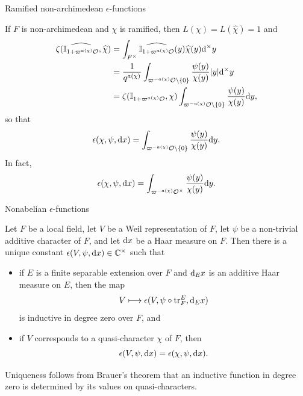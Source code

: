 \begin{frame}{Ramified non-archimedean $ \epsilon $-functions}

If $ F $ is non-archimedean and $ \chi $ is ramified, then $ L(\chi) = L(\widehat{\chi}) = 1 $ and
\begin{align*}
\zeta(\widehat{\mathbb{I}_{1 + \varpi^{a(\chi)}\mathcal{O}}}, \widehat{\chi})
& = \int_{F^\times} \widehat{\mathbb{I}_{1 + \varpi^{a(\chi)}\mathcal{O}}}(y)\widehat{\chi}(y)\mathrm{d}^\times y \\
& = \dfrac{1}{q^{a(\chi)}}\int_{\varpi^{-a(\chi)}\mathcal{O} \setminus \{0\}} \dfrac{\psi(y)}{\chi(y)}|y|\mathrm{d}^\times y \\
& = \zeta(\mathbb{I}_{1 + \varpi^{a(\chi)}\mathcal{O}}, \chi)\int_{\varpi^{-a(\chi)}\mathcal{O} \setminus \{0\}} \dfrac{\psi(y)}{\chi(y)}\mathrm{d} y,
\end{align*}
so that
$$ \epsilon(\chi, \psi, \mathrm{d} x) = \int_{\varpi^{-a(\chi)}\mathcal{O} \setminus \{0\}} \dfrac{\psi(y)}{\chi(y)}\mathrm{d} y. $$
In fact,
$$ \epsilon(\chi, \psi, \mathrm{d} x) = \int_{\varpi^{-a(\chi)}\mathcal{O}^\times} \dfrac{\psi(y)}{\chi(y)}\mathrm{d} y. $$

\end{frame}

\begin{frame}{Nonabelian $ \epsilon $-functions}

\begin{theorem}
Let $ F $ be a local field, let $ V $ be a Weil representation of $ F $, let $ \psi $ be a non-trivial additive character of $ F $, and let $ \mathrm{d} x $ be a Haar measure on $ F $. Then there is a unique constant $ \epsilon(V, \psi, \mathrm{d} x) \in \mathbb{C}^\times $ such that
\begin{itemize}
\item if $ E $ is a finite separable extension over $ F $ and $ \mathrm{d}_Ex $ is an additive Haar measure on $ E $, then the map
$$ V \longmapsto \epsilon(V, \psi \circ \operatorname{tr}_F^E, \mathrm{d}_Ex) $$
is inductive in degree zero over $ F $, and
\item if $ V $ corresponds to a quasi-character $ \chi $ of $ F $, then
$$ \epsilon(V, \psi, \mathrm{d} x) = \epsilon(\chi, \psi, \mathrm{d} x). $$
\end{itemize}
\end{theorem}

Uniqueness follows from Brauer's theorem that an inductive function in degree zero is determined by its values on quasi-characters.

\end{frame}

